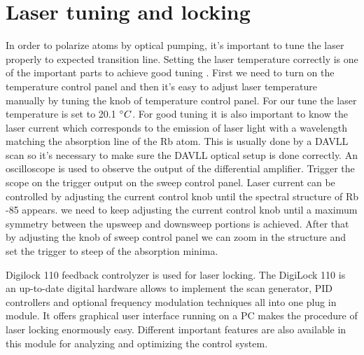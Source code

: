 \documentclass[12pt]{report}
\begin{document}
\section{Laser tuning and locking}
In order to polarize atoms by optical pumping, it's important to tune the laser properly to expected transition line.
Setting the laser temperature correctly is one of the important parts to achieve good tuning . First we need to turn on the temperature control panel and then it’s easy to adjust laser temperature manually by tuning the knob of temperature control panel. For our tune the laser temperature is set to 20.1 $\degree C$. For good tuning it is also important to know the laser current which corresponds to the emission of laser light with a wavelength matching the absorption line of the Rb atom. This is usually done by a DAVLL scan so it's necessary to make sure the DAVLL optical setup is done correctly. An oscilloscope is used to observe the output of the differential amplifier. Trigger the scope on the trigger output on the sweep control panel.
Laser current can be controlled by adjusting the current control knob until the spectral structure of Rb -85 appears. we need to keep adjusting the current control knob until a maximum symmetry between the upsweep and downsweep portions is achieved. After that by adjusting the knob of sweep control panel we can zoom in the structure and set the trigger to steep of the absorption minima. 


Digilock 110 feedback controlyzer is used for laser locking. The DigiLock 110 is an up-to-date digital hardware allows to implement the scan generator, PID controllers and optional frequency modulation techniques all into one plug in module. It offers graphical user interface running on a PC makes the procedure of laser locking enormously easy. Different important features are also available in this module for analyzing and optimizing the control system.
 
\end{document}
